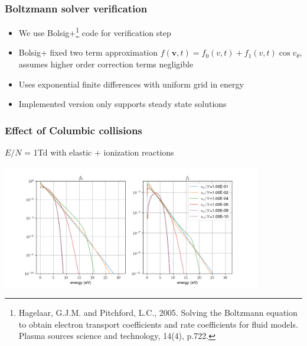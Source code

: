 \documentclass[mathserif, aspectratio=169]{beamer}
\newcommand{\vect}[1]{\boldsymbol{#1}}
\begin{document}
\begin{frame}
	\frametitle{Boltzmann solver verification}
	\begin{itemize}
		\item We use Bolsig+\footnote[frame]{Hagelaar, G.J.M. and Pitchford, L.C., 2005. Solving the Boltzmann equation to obtain electron transport coefficients and rate coefficients for fluid models. Plasma sources science and technology, 14(4), p.722.} code for verification step 
		\item Bolsig+ fixed two term approximation $f(\vect{v},t) = f_0(v, t) + f_1(v,t)\cos v_\theta$, assumes higher order correction terms negligible
		\item Uses exponential finite differences with uniform grid in energy
		\item Implemented version only supports steady state solutions
	\end{itemize}
\end{frame}

\begin{frame}
	\frametitle{Effect of Columbic collisions}
	$E/N$ = 1Td with elastic + ionization reactions
	\vspace*{-0.1in}
	\begin{center}
		\includegraphics[width=0.85\textwidth]{1Td_cc.png}
	\end{center}
\end{frame}
\end{document}
